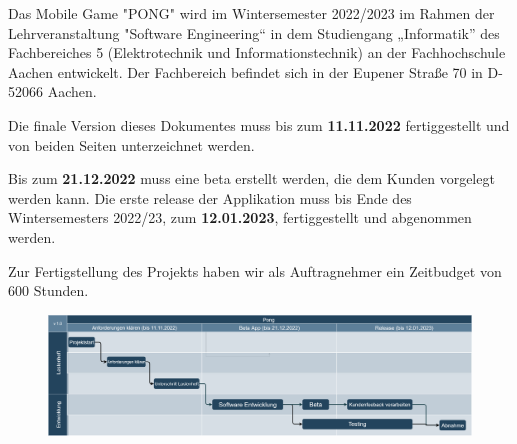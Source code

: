 
Das Mobile Game "PONG" wird im Wintersemester 2022/2023 im Rahmen der Lehrveranstaltung
"Software Engineering“ in dem Studiengang „Informatik” des Fachbereiches 5 (Elektrotechnik und
Informationstechnik) an der Fachhochschule Aachen entwickelt.
Der Fachbereich befindet sich in der Eupener Straße 70 in D-52066 Aachen.

Die finale Version dieses Dokumentes muss bis zum \textbf{11.11.2022} fertiggestellt und
von beiden Seiten unterzeichnet werden.

Bis zum \textbf{21.12.2022} muss eine \gls{beta} erstellt werden, die dem Kunden
vorgelegt werden kann. 
Die erste \gls{release} der Applikation muss bis Ende
des Wintersemesters 2022/23, zum \textbf{12.01.2023}, fertiggestellt und abgenommen werden.

Zur Fertigstellung des Projekts haben wir als Auftragnehmer ein Zeitbudget von 600 Stunden. 


\begin{figure}[h!]
    \includegraphics[width=\textwidth]{pics/ZeitlicherAblauf.png}
\end{figure}

